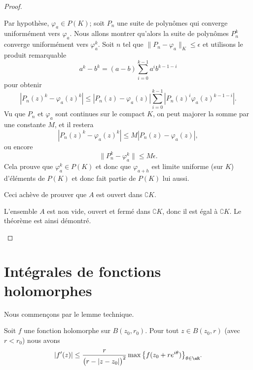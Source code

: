 \begin{proof}
\begin{subproof}
		Par hypothèse, \( \varphi_a\in P(K)\); soit \( P_n\) une suite de polynômes qui converge uniformément vers \( \varphi_a\). Nous allons montrer qu'alors la suite de polynômes \( P_n^k\) converge uniformément vers \( \varphi_a^k\). Soit \( n\) tel que \( \| P_n-\varphi_a \|_{K}\leq \epsilon\) et utilisons le produit remarquable
		\begin{equation}
			a^k-b^k=(a-b)\sum_{i=0}^{k-1}a^ib^{k-1-i}
		\end{equation}
		pour obtenir
		\begin{equation}
			| P_n(z)^k-\varphi_a(z)^k |\leq | P_n(z)-\varphi_a(z) |\sum_{i=0}^{k-1}| P_n(z)^i\varphi_a(z)^{k-1-i} |.
		\end{equation}
		Vu que \( P_n\) et \( \varphi_a\) sont continues sur le compact \( K\), on peut majorer la somme par une constante \( M\), et il restera
		\begin{equation}
			| P_n(z)^k-\varphi_a(z)^k |\leq M | P_n(z)-\varphi_a(z) |,
		\end{equation}
		ou encore
		\begin{equation}
			\| P_n^k-\varphi_a^k \|\leq M\epsilon.
		\end{equation}
		Cela prouve que \( \varphi_a^{k}\in P(K)\) et donc que \( \varphi_{a+h}\) est limite uniforme (sur \( K\)) d'éléments de \( P(K)\) et donc fait partie de \( P(K)\) lui aussi.

		Ceci achève de prouver que \( A\) est ouvert dans \( \complement K\).
		\spitem[Conclusion]

		L'ensemble \( A\) est non vide, ouvert et fermé dans \( \complement K\), donc il est égal à \( \complement K\). Le théorème est ainsi démontré.
	\end{subproof}
\end{proof}

\section{Intégrales de fonctions holomorphes}

Nous commençons par le lemme technique.
\begin{lemma}       \label{LemNAnweA}
	Soit \( f\) une fonction holomorphe sur \( B(z_0,r_0)\). Pour tout \( z\in B(z_0,r)\) (avec \( r<r_0\)) nous avons
	\begin{equation}
		| f'(z) |\leq \frac{ r }{ \big( r-| z-z_0 | \big)^2 }\max\big\{ f(z_0+r e^{i\theta}) \big\}_{\theta\in \eR}.
	\end{equation}
\end{lemma}

